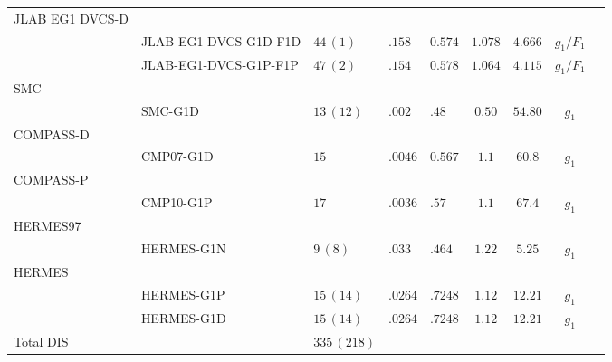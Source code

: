 \begin{tabularx}{1\pdfpagewidth}{llXXXcccc}
  \midrule
   JLAB EG1 DVCS-D 
       \\        & JLAB-EG1-DVCS-G1D-F1D & $44\,(1)$ & $.158$ & $0.574$ & $1.078$ & $4.666$ & $g_1/F_1$ & \cite{CLAS:2014qtg}
       \\        & JLAB-EG1-DVCS-G1P-F1P & $47\,(2)$ & $.154$ & $0.578$ & $1.064$ & $4.115$ & $g_1/F_1$ & \cite{CLAS:2014qtg} \\
  \midrule
   SMC
       \\        & SMC-G1D & $13\,(12)$ & $.002$ & $.48$ & $0.50$ & $54.80$ & $g_1$ &  \cite{SpinMuon:1999udj} \\
  \midrule 
   COMPASS-D
       \\        & CMP07-G1D & $15$ & $.0046$ & $0.567$ & $1.1$ & $60.8$ & $g_1$ & \cite{COMPASS:2006mhr} \\
  \midrule
   COMPASS-P 
       \\        & CMP10-G1P & $17$ & $.0036$ & $.57$ & $1.1$ & $67.4$ & $g_1$ & \cite{COMPASS:2010wkz} \\
  \midrule 
   HERMES97 
       \\        & HERMES-G1N & $9\,(8)$ & $.033$ & $.464$ & $1.22$ & $5.25$ & $g_1$ & \cite{HERMES:1997hjr} \\
  \midrule
   HERMES 
       \\        & HERMES-G1P & $15\,(14)$ & $.0264$ & $.7248$ & $1.12$ & $12.21$ & $g_1$ & \cite{HERMES:2006jyl} 
       \\        & HERMES-G1D & $15\,(14)$ & $.0264$ & $.7248$ & $1.12$ & $12.21$ & $g_1$ & \cite{HERMES:2006jyl} \\
  \midrule
   Total DIS         &    & $335 \, (218)$  & & &  &    &      &      \\
  \bottomrule
\end{tabularx}